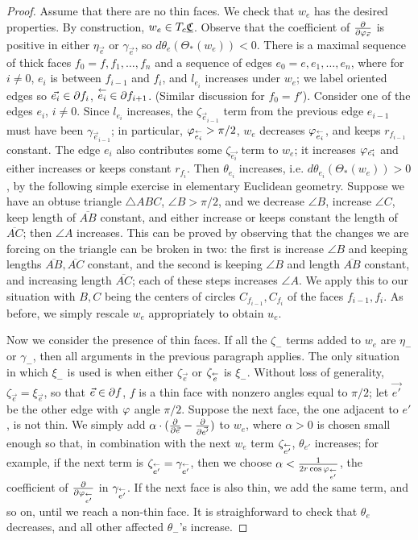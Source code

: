 \begin{proof}
Assume that there are no thin faces.
We check that $w_e$ has the desired properties.
By construction, $w_e \in T_c {\underline{\mathfrak{C}}}$.
Observe that the coefficient of ${\frac{\partial}{\partial \varphi_{\vec{e}}}}$
is positive in either $\eta_{\vec{e}}$ or $\gamma_{\vec{e}}$,
so $d\theta_e(\Theta_*(w_e)) < 0$.
There is a maximal sequence of thick faces
$f_0 = f, f_1, \ldots, f_n$
and a sequence of edges $e_0 = e, e_1, \ldots, e_n$,
where for $i\neq 0$, $e_i$ is between $f_{i-1}$ and $f_i$,
and $l_{e_i}$ increases under $w_e$;
we label oriented edges so $\vec{e_i} \in \partial f_i$,
$\overset{\leftarrow}{e_i} \in \partial f_{i+1}$.
(Similar discussion for $f_0 = f'$).
Consider one of the edges $e_i$, $i\neq 0$.
Since $l_{e_i}$ increases, the $\zeta_{\vec{e}_{i-1}}$ term
from the previous edge $e_{i-1}$ must have been
$\gamma_{\vec{e}_{i-1}}$;
in particular, $\varphi_{\overset{\leftarrow}{e_i}} > \pi/2$,
$w_e$ decreases $\varphi_{\overset{\leftarrow}{e_i}}$,
and keeps $r_{f_{i-1}}$ constant.
The edge $e_i$ also contributes some $\zeta_{\vec{e_i}}$
term to $w_e$;
it increases $\varphi_{\vec{e_i}}$ and either increases
or keeps constant $r_{f_i}$.
Then $\theta_{e_i}$ increases, i.e. $d\theta_{e_i}(\Theta_*(w_e)) > 0$,
by the following simple exercise in elementary Euclidean geometry.
Suppose we have an obtuse triangle $\triangle ABC$, $\angle B > \pi/2$,
and we decrease $\angle B$, increase $\angle C$,
keep length of $\overline{AB}$ constant,
and either increase or keeps constant the length of $\overline{AC}$;
then $\angle A$ increases.
This can be proved by observing that the changes we are forcing
on the triangle can be broken in two:
the first is increase $\angle B$ and keeping lengths
$\overline{AB}, \overline{AC}$ constant,
and the second is keeping $\angle B$ and length $\overline{AB}$ constant,
and increasing length $\overline{AC}$;
each of these steps increases $\angle A$.
We apply this to our situation with $B,C$ being
the centers of circles $C_{f_{i-1}}, C_{f_i}$
of the faces $f_{i-1}, f_i$.
As before, we simply rescale $w_e$ appropriately to obtain $u_e$.

Now we consider the presence of thin faces.
If all the $\zeta_-$ terms added to $w_e$
are $\eta_-$ or $\gamma_-$,
then all arguments in the previous paragraph applies.
The only situation in which $\xi_-$ is used
is when either $\zeta_{\vec{e}}$ or $\zeta_{\overset{\leftarrow}{e}}$ is $\xi_-$.
Without loss of generality, $\zeta_{\vec{e}} = \xi_{\vec{e}}$,
so that $\vec{e} \in \partial f$, $f$ is a thin face with nonzero
angles equal to $\pi/2$;
let $\vec{e'}$ be the other edge with $\varphi$ angle $\pi/2$.
Suppose the next face, the one adjacent to $e'$, is not thin.
We simply add $\alpha \cdot ({\frac{\partial}{\partial \vec{e}}} - {\frac{\partial}{\partial \vec{e'}}})$
to $w_e$,
where $\alpha > 0$ is chosen small enough so that, in combination
with the next $w_e$ term $\zeta_{\overset{\leftarrow}{e'}}$,
$\theta_{e'}$ increases;
for example, if the next term is $\zeta_{\overset{\leftarrow}{e'}} = \gamma_{\overset{\leftarrow}{e'}}$,
then we choose $\alpha < \frac{1}{2r \cos \varphi_{\overset{\leftarrow}{e'}}}$,
the coefficient of ${\frac{\partial}{\partial \varphi_{\overset{\leftarrow}{e'}}}}$ in $\gamma_{\overset{\leftarrow}{e'}}$.
If the next face is also thin,
we add the same term, and so on, until we reach a non-thin face.
It is straighforward to check that $\theta_e$ decreases,
and all other affected $\theta_-$'s increase.
\end{proof}



